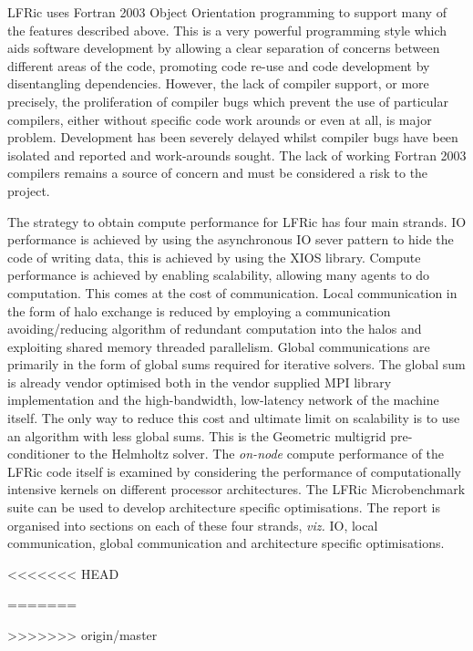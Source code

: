 \documentclass[11pt]{article}
\begin{document}
LFRic uses Fortran 2003 Object Orientation programming to support many of the
features described above. This is a very powerful programming
style which aids software development by allowing a clear separation
of concerns between different areas of the code, promoting code re-use
and code development by disentangling dependencies. However, the lack
of compiler support, or more precisely, the proliferation of compiler
bugs which prevent the use of particular compilers, either without specific
code work arounds or even at all, is major problem. Development has
been severely delayed whilst compiler bugs have been isolated and
reported and work-arounds sought. The lack of working Fortran 2003
compilers remains a source of concern and must be considered a risk to
the project.

The strategy to obtain compute performance for LFRic has four main
strands. IO performance is achieved by using the asynchronous IO sever
pattern to hide the code of writing data, this is achieved by using
the XIOS library. Compute performance is achieved by enabling
scalability, allowing many agents to do computation. This comes at the
cost of communication. Local communication in the form of halo
exchange is reduced by employing a communication avoiding/reducing
algorithm of redundant computation into the halos and exploiting shared
memory threaded parallelism. Global communications are primarily in
the form of global sums required for iterative solvers. The global sum
is already vendor optimised both in the vendor supplied MPI library
implementation and the high-bandwidth, low-latency network of the
machine itself. The only way to reduce this cost and ultimate limit on
scalability is to use an algorithm with less global sums. This is the
Geometric multigrid pre-conditioner to the Helmholtz solver. The {\em
  on-node} compute performance of the LFRic code itself is examined by
considering the performance of computationally intensive kernels on
different processor architectures. The LFRic Microbenchmark suite can
be used to develop architecture specific optimisations.
The report is organised into sections on each of these four strands,
{\em viz.} IO, local communication, global communication and
architecture specific optimisations.




<<<<<<< HEAD

=======


>>>>>>> origin/master
\end{document}
